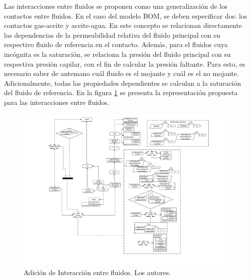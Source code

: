 Las interacciones entre fluidos se proponen como una generalización de los contactos entre fluidos. En el caso del modelo BOM, se deben especificar dos: los contactos gas-aceite y aceite-agua. En este concepto se relacionan directamente las dependencias de la permeabilidad relativa del fluido principal con su respectivo fluido de referencia en el contacto. Además, para el fluidos cuya incógnita es la saturación, se relaciona la presión del fluido principal con su respectiva presión capilar, con el fin de calcular la presión faltante. Para esto, es necesario saber de antemano cuál fluido es el mojante y cuál es el no mojante. Adicionalmente, todas las propiedades dependientes se calculan a la saturación del fluido de referencia. En la figura \ref{fig:Contact} se presenta la representación propuesta para las interacciones entre fluidos.

\begin{figure}[h]
	\centering%
	\includegraphics[width=0.9\linewidth]{Fig/Equilibrium.pdf}%
	\caption[Adición de Interacción entre fluidos.]{Adición de Interacción entre fluidos. Los autores.} \label{fig:Contact}
\end{figure}
